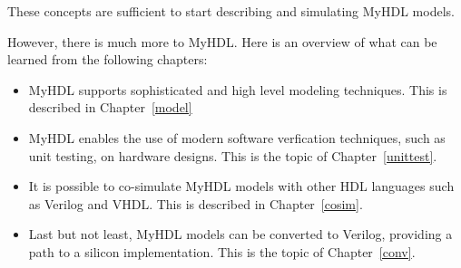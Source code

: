 These concepts are sufficient to start describing and simulating MyHDL models.

However, there is much more to MyHDL. Here is an overview of what can
be learned from the following chapters:

\begin{itemize}
\item MyHDL supports sophisticated and high level modeling techniques.
This is described in Chapter~\ref{model}

\item MyHDL enables the use of modern software verfication techniques,
such as unit testing, on hardware designs. This is the topic of
Chapter~\ref{unittest}.

\item It is possible to co-simulate MyHDL models with other HDL
languages such as Verilog and VHDL. This is described in
Chapter~\ref{cosim}.

\item Last but not least, MyHDL models can be converted to
Verilog, providing a path to a silicon implementation. This
is the topic of Chapter~\ref{conv}.
\end{itemize}
